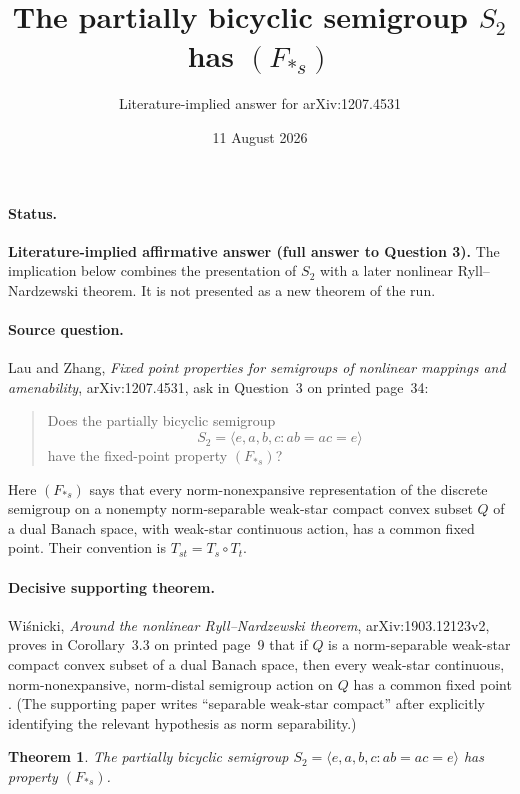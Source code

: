 \documentclass[11pt]{article}
\title{The partially bicyclic semigroup \(S_2\) has \((F_{*s})\)}
\author{Literature-implied answer for arXiv:1207.4531}
\date{11 August 2026}
\newtheorem*{theorem}{Theorem}
\begin{document}
\maketitle

\paragraph{Status.}
\textbf{Literature-implied affirmative answer (full answer to Question 3).}
The implication below combines the presentation of \(S_2\) with a later
nonlinear Ryll--Nardzewski theorem.  It is not presented as a new theorem of
the run.

\paragraph{Source question.}
Lau and Zhang, \emph{Fixed point properties for semigroups of nonlinear
mappings and amenability}, arXiv:1207.4531, ask in Question~3 on printed
page~34:
\begin{quote}
Does the partially bicyclic semigroup
\[
 S_2=\langle e,a,b,c:ab=ac=e\rangle
\]
have the fixed-point property \((F_{*s})\)?
\end{quote}
Here \((F_{*s})\) says that every norm-nonexpansive representation of the
discrete semigroup on a nonempty norm-separable weak-star compact convex
subset \(Q\) of a dual Banach space, with weak-star continuous action, has a
common fixed point.  Their convention is \(T_{st}=T_s\circ T_t\).

\paragraph{Decisive supporting theorem.}
Wiśnicki, \emph{Around the nonlinear Ryll--Nardzewski theorem},
arXiv:1903.12123v2, proves in Corollary~3.3 on printed page~9 that if \(Q\) is
a norm-separable weak-star compact convex subset of a dual Banach space, then
every weak-star continuous, norm-nonexpansive, norm-distal semigroup action on
\(Q\) has a common fixed point \cite{Wisnicki}.  (The supporting paper writes
``separable weak-star compact'' after explicitly identifying the relevant
hypothesis as norm separability.)

\begin{theorem}
The partially bicyclic semigroup
\(S_2=\langle e,a,b,c:ab=ac=e\rangle\) has property \((F_{*s})\).
\end{theorem}
\end{document}
